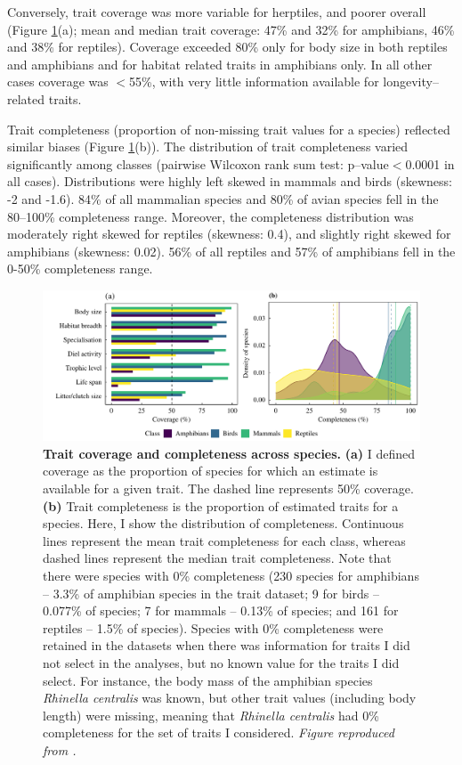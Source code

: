 Conversely, trait coverage was more variable for herptiles, and poorer overall (Figure \ref{1_Coverage}(a); mean and median trait coverage: 47\% and 32\% for amphibians, 46\% and 38\% for reptiles). Coverage exceeded 80\% only for body size in both reptiles and amphibians and for habitat related traits in amphibians only. In all other cases coverage was  $<$55\%, with very little information available for longevity--related traits. 

Trait completeness (proportion of non-missing trait values for a species) reflected similar biases (Figure \ref{1_Coverage}(b)). The distribution of trait completeness varied significantly among classes (pairwise Wilcoxon rank sum test: p--value$<$0.0001 in all cases). Distributions were highly left skewed in mammals and birds (skewness: -2 and -1.6). 84\% of all mammalian species and 80\% of avian species fell in the 80--100\% completeness range. Moreover, the completeness distribution was moderately right skewed for reptiles (skewness: 0.4), and slightly right skewed for amphibians (skewness: 0.02). 56\% of all reptiles and 57\% of amphibians fell in the 0-50\% completeness range. 

\begin{figure}[h!]
\centering
\includegraphics[scale=0.7]{figures/Chapter1/Figure1_revised}
\caption[Trait coverage and completeness across species.]{\textbf{Trait coverage and completeness across species.} \textbf{(a)} I defined coverage as the proportion of species for which an estimate is available for a given trait. The dashed line represents 50\% coverage. \textbf{(b)} Trait completeness is the proportion of estimated traits for a species. Here, I show the distribution of completeness. Continuous lines represent the mean trait completeness for each class, whereas dashed lines represent the median trait completeness. Note that there were species with 0\% completeness (230 species for amphibians -- 3.3\% of amphibian species in the trait dataset; 9 for birds -- 0.077\% of species; 7 for mammals -- 0.13\% of species; and 161 for reptiles -- 1.5\% of species). Species with 0\% completeness were retained in the datasets when there was information for traits I did not select in the analyses, but no known value for the traits I did select. For instance, the body mass of the amphibian species \textit{Rhinella centralis} was known, but other trait values (including body length) were missing, meaning that \textit{Rhinella centralis} had 0\% completeness for the set of traits I considered. \textit{Figure reproduced from \citet{Etard2020}.}}
\label{1_Coverage}
\end{figure}


